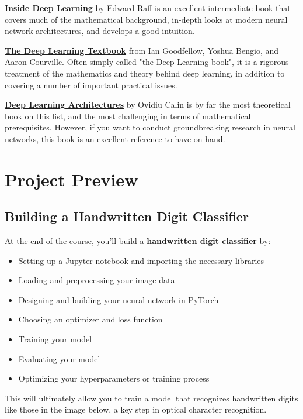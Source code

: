\href{https://www.manning.com/books/inside-deep-learning}{\textbf{Inside Deep Learning}} by Edward Raff is an excellent intermediate book that covers much of the mathematical background, in-depth looks at modern neural network architectures, and develops a good intuition.

\href{http://www.deeplearningbook.org/}{\textbf{The Deep Learning Textbook}} from Ian Goodfellow, Yoshua Bengio, and Aaron Courville. Often simply called "the Deep Learning book", it is a rigorous treatment of the mathematics and theory behind deep learning, in addition to covering a number of important practical issues.

\href{https://link.springer.com/book/10.1007/978-3-030-36721-3}{\textbf{Deep Learning Architectures}} by Ovidiu Calin is by far the most theoretical book on this list, and the most challenging in terms of mathematical prerequisites. However, if you want to conduct groundbreaking research in neural networks, this book is an excellent reference to have on hand.

\section{Project Preview}

\subsection{Building a Handwritten Digit Classifier}

At the end of the course, you'll build a \textbf{handwritten digit classifier} by:

\begin{itemize}
    \item Setting up a Jupyter notebook and importing the necessary libraries
    \item Loading and preprocessing your image data
    \item Designing and building your neural network in PyTorch
    \item Choosing an optimizer and loss function
    \item Training your model
    \item Evaluating your model
    \item Optimizing your hyperparameters or training process
\end{itemize}
This will ultimately allow you to train a model that recognizes handwritten digits like those in the image below, a key step in optical character recognition.

